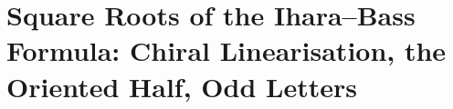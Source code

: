 
\section{Square Roots of the Ihara--Bass Formula: Chiral Linearisation, the Oriented Half, Odd Letters}
\label{sec:ihara-dirac}

